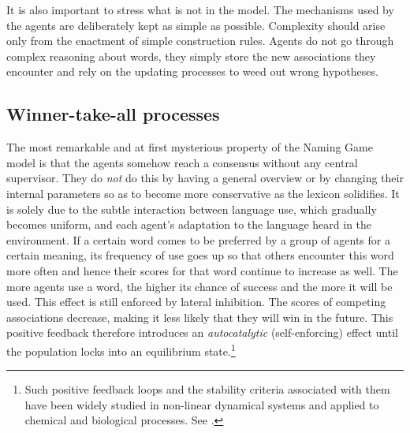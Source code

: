 It is also important to stress what is not in the model. 
The mechanisms used by the agents are deliberately kept as 
simple as possible. Complexity should arise only from the 
enactment of simple construction rules. Agents do not 
go through complex reasoning about words, they simply 
store the new associations they encounter and rely on 
the updating processes to weed out wrong hypotheses. 

\subsection{Winner-take-all processes}

The most remarkable and at first mysterious property of the 
Naming Game model is that the agents somehow reach a consensus
without any central supervisor. They do {\it not} do this by 
having a general overview or by changing their internal 
parameters so as to become more conservative as the lexicon
solidifies. It is solely due to the subtle interaction between
language use, which gradually becomes uniform, and each agent's
adaptation to the language heard in the environment. 
If a certain word comes to be preferred by a group of agents
for a certain meaning, its frequency of use goes up so that
others encounter this 
word more often and hence their scores for that word
continue to increase as well.
The more agents use a word, the higher its chance of success
and the more it will be used. This effect is still enforced 
by lateral inhibition. The scores of competing associations 
decrease, making it less likely that they will win in the future. 
This positive feedback therefore introduces an 
{\it autocatalytic} (self-enforcing) effect until the population
locks into an equilibrium state.\footnote{
Such positive feedback loops and the stability criteria
associated with them have been widely studied in non-linear
dynamical systems and applied to chemical and biological 
processes. See \cite{Babloyantz:1986}.}

